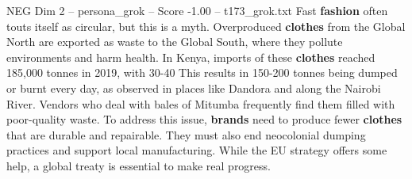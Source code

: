 \begin{textsample}{NEG Dim 2 – persona\_grok – Score -1.00 – t173\_grok.txt}  \label{ex:f2_neg_025}
Fast \textbf{fashion} often touts itself as circular, but this is a myth.
Overproduced \textbf{clothes} from the Global North are exported as waste to the Global South, where they pollute environments and harm health.
In Kenya, imports of these \textbf{clothes} reached 185,000 tonnes in 2019, with 30-40 %
This results in 150-200 tonnes being dumped or burnt every day, as observed in places like Dandora and along the Nairobi River.
Vendors who deal with bales of Mitumba frequently find them filled with poor-quality waste.
To address this issue, \textbf{brands} need to produce fewer \textbf{clothes} that are durable and repairable.
They must also end neocolonial dumping practices and support local manufacturing.
While the EU strategy offers some help, a global treaty is essential to make real progress.

\end{textsample}
